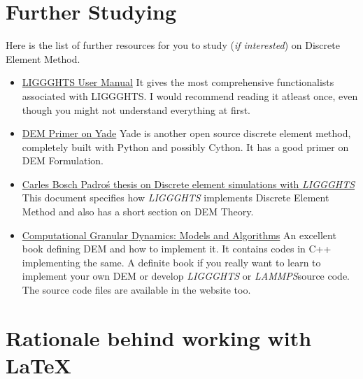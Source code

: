 \documentclass{tufte-book} %
\newcommand{\Li}{\textit{LIGGGHTS}\xspace}
\newcommand{\La}{\textit{LAMMPS}}
\begin{document}
\section{Further Studying}
Here is the list of further resources for you to study (\textit{if interested}) on Discrete Element Method.
\begin{itemize}
\item \href{http://www.cfdem.com/media/DEM/docu/Manual.html}{LIGGGHTS User Manual}
  It gives the most comprehensive functionalists associated with LIGGGHTS. I would recommend reading it atleast once, even though you might not understand everything at first.

\item \href{https://yade-dem.org/doc/formulation.html}{DEM Primer on Yade}
  Yade is another open source discrete element method, completely built with Python and possibly Cython. It has a good primer on DEM Formulation. 
\item \href{http://www.cimne.com/cvdata/cntr2/spc31/dtos/img/mdia/thesis/CarlesBosch.pdf}{Carles Bosch Padro\'s thesis on Discrete element simulations with \Li}
  This document specifies how \Li implements Discrete Element Method and also has a short section on DEM Theory. 
\item \href{www.springer.com/us/book/9783540214854}{Computational Granular Dynamics: Models and Algorithms}
  An excellent book defining DEM and how to implement it. It contains codes in C++ implementing the same. A definite book if you really want to learn to implement your own DEM or develop \Li or \La source code. The source code files are available in the website too. 
\end{itemize}

\section{Rationale behind working with \LaTeX}
\end{document}
